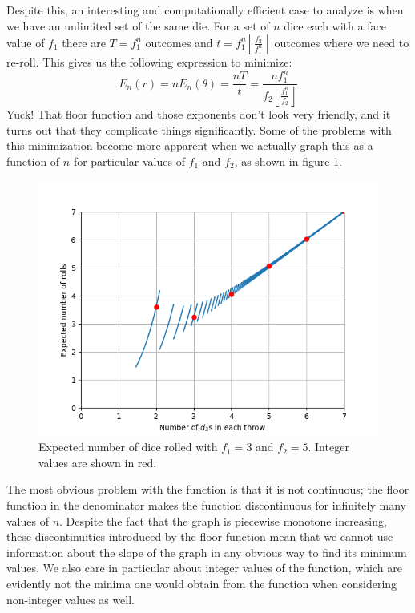 \documentclass{article}
\begin{document}
\par Despite this, an interesting and computationally efficient case to analyze is when we have an unlimited set of the same die.
For a set of $n$ dice each with a face value of $f_1$ there are $T = f_1^n$ outcomes and $t = f_1^n \left\lfloor \frac{f_2}{f_1^n} \right\rfloor$ outcomes where we need to re-roll.
This gives us the following expression to minimize: $$E_n(r) = nE_n(\theta)= \frac{nT}{t} = \frac{nf_1^n}{f_2 \left \lfloor \frac{f_1^n}{f_2} \right \rfloor}$$ 
Yuck! 
That floor function and those exponents don't look very friendly, and it turns out that they complicate things significantly.
Some of the problems with this minimization become more apparent when we actually graph this as a function of $n$ for particular values of $f_1$ and $f_2$, as shown in figure \ref{fig:num-rolls}.
\begin{figure}
    \centering
    \includegraphics[scale=0.5]{num-rolls.png}
    \caption{Expected number of dice rolled with $f_1=3$ and $f_2=5$. Integer values are shown in red.}
    \label{fig:num-rolls}
\end{figure}
The most obvious problem with the function is that it is not continuous; the floor function in the denominator makes the function discontinuous for infinitely many values of $n$.
Despite the fact that the graph is piecewise monotone increasing, these discontinuities introduced by the floor function mean that we cannot use information about the slope of the graph in any obvious way to find its minimum values.
We also care in particular about integer values of the function, which are evidently not the minima one would obtain from the function when considering non-integer values as well.
\end{document}
